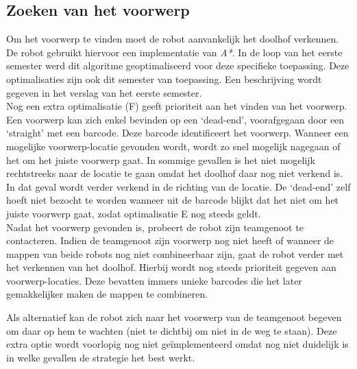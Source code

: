 \documentclass[tt2]{penoverslag}
\begin{document}
\subsection{Zoeken van het voorwerp} %
\label{ssec:algoZoek}
Om het voorwerp te vinden moet de robot aanvankelijk het doolhof verkennen. De robot gebruikt hiervoor een implementatie van \textit{A*}. In de loop van het eerste semester werd dit algoritme geoptimaliseerd voor deze specifieke toepassing. Deze optimalisaties zijn ook dit semester van toepassing. Een beschrijving wordt gegeven in het verslag van het eerste semester.\\

Nog een extra optimalisatie (F) geeft prioriteit aan het vinden van het voorwerp. Een voorwerp kan zich enkel bevinden op een `dead-end', voorafgegaan door een `straight' met een barcode. Deze barcode identificeert het voorwerp. Wanneer een mogelijke voorwerp-locatie gevonden wordt, wordt zo snel mogelijk nagegaan of het om het juiste voorwerp gaat. In sommige gevallen is het niet mogelijk rechtstreeks naar de locatie te gaan omdat het doolhof daar nog niet verkend is. In dat geval wordt verder verkend in de richting van de locatie. De `dead-end' zelf hoeft niet bezocht te worden wanneer uit de barcode blijkt dat het niet om het juiste voorwerp gaat, zodat optimalisatie E nog steeds geldt.\\

Nadat het voorwerp gevonden is, probeert de robot zijn teamgenoot te contacteren. Indien de teamgenoot zijn voorwerp nog niet heeft of wanneer de mappen van beide robots nog niet combineerbaar zijn, gaat de robot verder met het verkennen van het doolhof. Hierbij wordt nog steeds prioriteit gegeven aan voorwerp-locaties. Deze bevatten immers unieke barcodes die het later gemakkelijker maken de mappen te combineren.

Als alternatief kan de robot zich naar het voorwerp van de teamgenoot begeven om daar op hem te wachten (niet te dichtbij om niet in de weg te staan). Deze extra optie wordt voorlopig nog niet ge\"implementeerd omdat nog niet duidelijk is in welke gevallen de strategie het best werkt.

\end{document}
